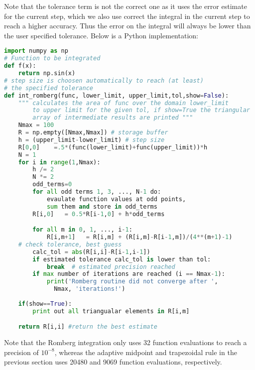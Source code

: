 \documentclass[graybox,sectrefs,envcountresetchap,open=right,final]{svmonodo}
\begin{document}
Note that the tolerance term is not the correct one as it uses the error estimate for the current step, 
which we also use correct the integral in the current step to reach a higher accuracy. 
Thus the error on the integral will always be lower than the user specified tolerance.
Below is a Python implementation:
\begin{lstlisting}[language=Python,style=blue1bar]
import numpy as np
# Function to be integrated
def f(x):
    return np.sin(x)
# step size is choosen automatically to reach (at least) 
# the specified tolerance 
def int_romberg(func, lower_limit, upper_limit,tol,show=False):
    """ calculates the area of func over the domain lower_limit
        to upper limit for the given tol, if show=True the triangular
        array of intermediate results are printed """
    Nmax = 100
    R = np.empty([Nmax,Nmax]) # storage buffer
    h = (upper_limit-lower_limit) # step size
    R[0,0]    =.5*(func(lower_limit)+func(upper_limit))*h
    N = 1
    for i in range(1,Nmax):
        h /= 2
        N *= 2
        odd_terms=0
        for all odd terms 1, 3, ..., N-1 do:
            evaulate function values at odd points,
            sum them and store in odd_terms
        R[i,0]   = 0.5*R[i-1,0] + h*odd_terms

        for all m in 0, 1, ..., i-1:
            R[i,m+1]   = R[i,m] + (R[i,m]-R[i-1,m])/(4**(m+1)-1)                  
	# check tolerance, best guess			
        calc_tol = abs(R[i,i]-R[i-1,i-1])       
        if estimated tolerance calc_tol is lower than tol:
            break  # estimated precision reached
        if max number of iterations are reached (i == Nmax-1):
            print('Romberg routine did not converge after ',
              Nmax, 'iterations!')
            
    if(show==True):
        print out all triangualar elements in R[i,m]

    return R[i,i] #return the best estimate
\end{lstlisting}

Note that the Romberg integration only uses 32 function evaluations to reach a precision of $10^{-8}$, whereas the adaptive midpoint and trapezoidal rule in the previous
section uses 20480 and 9069 function evaluations, respectively. 
\end{document}

